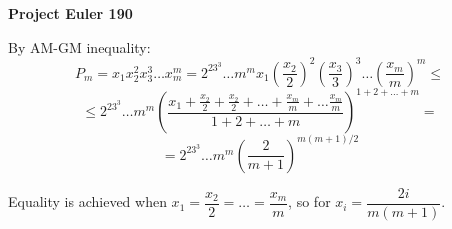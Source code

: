 \documentclass[a4paper,12pt]{article}
\begin{document}
\setlength\parindent{0pt}
\textbf{Project Euler 190}
\vspace{5ex}

By AM-GM inequality:
\[P_m = x_1 x_2^2 x_3^3\dots x_m^m = 2^23^3\dots m^m x_1\left(\frac{x_2}{2}\right)^2 \left(\frac{x_3}{3}\right)^3 \dots \left(\frac{x_m}{m}\right)^m \leq \]
\[\leq 2^23^3\dots m^m \left( \frac{x_1 + \frac{x_2}{2} + \frac{x_2}{2} + \dots + \frac{x_m}{m} + \dots \frac{x_m}{m}}{1 + 2 + \dots + m}\right)^{1 + 2 + \dots + m} =\] \[= 2^23^3\dots m^m \left(\frac{2}{m + 1} \right)^{m(m+1)/2}\]

Equality is achieved when \(x_1 = \dfrac{x_2}{2} = \dots = \dfrac{x_m}{m}\), so for \(x_i = \dfrac{2i}{m(m+1)}\).
\end{document}
